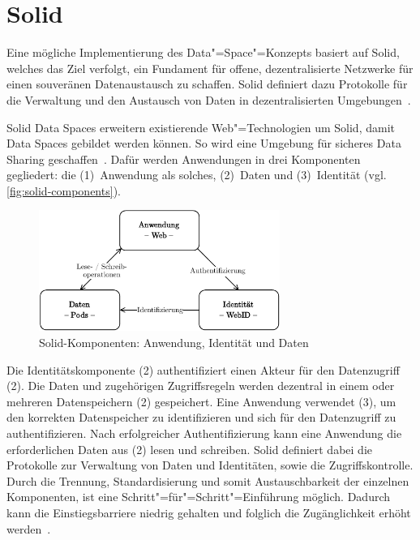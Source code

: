 
\section{Solid}

Eine mögliche Implementierung des Data"=Space"=Konzepts basiert auf Solid, welches das Ziel verfolgt, ein Fundament für offene, dezentralisierte Netzwerke für einen souveränen Datenaustausch zu schaffen.
Solid definiert dazu Protokolle für die Verwaltung und den Austausch von Daten in dezentralisierten Umgebungen~\cite{mecklerWebLinkedData2023}.

Solid Data Spaces erweitern existierende Web"=Technologien um Solid, damit Data Spaces gebildet werden können.
So wird eine Umgebung für sicheres Data Sharing geschaffen~\cite{mecklerWebLinkedData2023}.
Dafür werden Anwendungen in drei Komponenten gegliedert: die (1)~Anwendung als solches, (2)~Daten und (3)~Identität (vgl. \autoref{fig:solid-components}).

\begin{figure}[t]
    \includegraphics[width=0.7\textwidth]{./assets/solid_triangle.drawio.pdf}
    \caption{Solid-Komponenten: Anwendung, Identität und Daten}
    \label{fig:solid-components}
\end{figure}

Die Identitätskomponente (2) authentifiziert einen Akteur für den Datenzugriff (2).
Die Daten und zugehörigen Zugriffsregeln werden dezentral in einem oder mehreren Datenspeichern (2) gespeichert.
Eine Anwendung verwendet (3), um den korrekten Datenspeicher zu identifizieren und sich für den Datenzugriff zu authentifizieren.
Nach erfolgreicher Authentifizierung kann eine Anwendung die erforderlichen Daten aus (2) lesen und schreiben.
Solid definiert dabei die Protokolle zur Verwaltung von Daten und Identitäten, sowie die Zugriffskontrolle.
Durch die Trennung, Standardisierung und somit Austauschbarkeit der einzelnen Komponenten, ist eine Schritt"=für"=Schritt"=Einführung möglich.
Dadurch kann die Einstiegsbarriere niedrig gehalten und folglich die Zugänglichkeit erhöht werden~\cite{mecklerWebLinkedData2023}.


